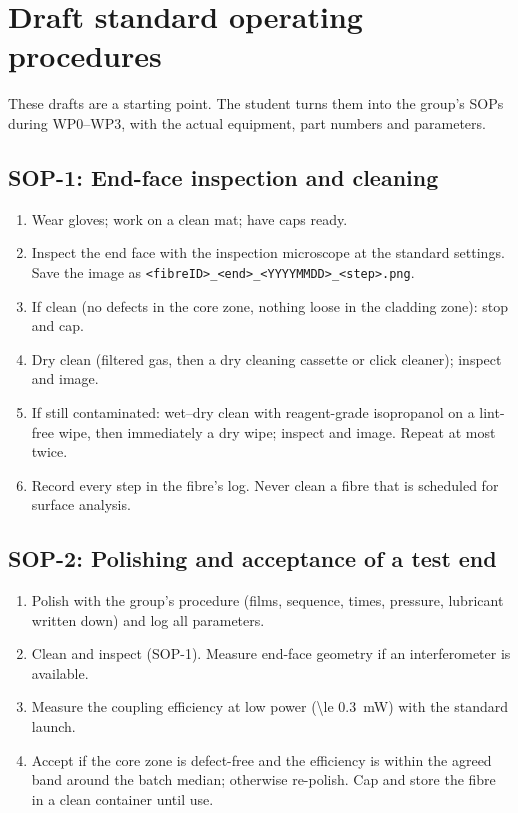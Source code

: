 \section{Draft standard operating procedures}\label{app:sops}
These drafts are a starting point. The student turns them into the group's SOPs during WP0--WP3, with
the actual equipment, part numbers and parameters.

\subsection*{SOP-1: End-face inspection and cleaning}
\begin{enumerate}
  \item Wear gloves; work on a clean mat; have caps ready.
  \item Inspect the end face with the inspection microscope at the standard settings. Save the image as
        \texttt{<fibreID>\_<end>\_<YYYYMMDD>\_<step>.png}.
  \item If clean (no defects in the core zone, nothing loose in the cladding zone): stop and cap.
  \item Dry clean (filtered gas, then a dry cleaning cassette or click cleaner); inspect and image.
  \item If still contaminated: wet--dry clean with reagent-grade isopropanol on a lint-free wipe, then
        immediately a dry wipe; inspect and image. Repeat at most twice.
  \item Record every step in the fibre's log. Never clean a fibre that is scheduled for surface analysis.
\end{enumerate}

\subsection*{SOP-2: Polishing and acceptance of a test end}
\begin{enumerate}
  \item Polish with the group's procedure (films, sequence, times, pressure, lubricant written down) and
        log all parameters.
  \item Clean and inspect (SOP-1). Measure end-face geometry if an interferometer is available.
  \item Measure the coupling efficiency at low power (\SI{\le 0.3}{mW}) with the standard launch.
  \item Accept if the core zone is defect-free and the efficiency is within the agreed band around the
        batch median; otherwise re-polish. Cap and store the fibre in a clean container until use.
\end{enumerate}


